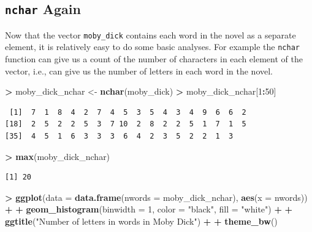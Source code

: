 \documentclass[]{krantz}
\makeatletter
\newenvironment{Shaded}{\begin{snugshade}}{\end{snugshade}}
\newcommand{\DataTypeTok}[1]{\textcolor[rgb]{0.27,0.27,0.27}{#1}}
\newcommand{\DecValTok}[1]{\textcolor[rgb]{0.06,0.06,0.06}{#1}}
\newcommand{\KeywordTok}[1]{\textcolor[rgb]{0.27,0.27,0.27}{\textbf{#1}}}
\newcommand{\NormalTok}[1]{#1}
\newcommand{\OperatorTok}[1]{\textcolor[rgb]{0.43,0.43,0.43}{\textbf{#1}}}
\newcommand{\StringTok}[1]{\textcolor[rgb]{0.5,0.5,0.5}{#1}}
\newenvironment{kframe}{%
\medskip{}
\setlength{\fboxsep}{.8em}
 \def\at@end@of@kframe{}%
 \ifinner\ifhmode%
  \def\at@end@of@kframe{\end{minipage}}%
  \begin{minipage}{\columnwidth}%
 \fi\fi%
 \def\FrameCommand##1{\hskip\@totalleftmargin \hskip-\fboxsep
 \colorbox{shadecolor}{##1}\hskip-\fboxsep
     \hskip-\linewidth \hskip-\@totalleftmargin \hskip\columnwidth}%
 \MakeFramed {\advance\hsize-\width
   \@totalleftmargin\z@ \linewidth\hsize
   \@setminipage}}%
 {\par\unskip\endMakeFramed%
 \at@end@of@kframe}
\renewenvironment{Shaded}{\begin{kframe}}{\end{kframe}}
\makeatother
\begin{document}
\hypertarget{nchar-again}{%
\subsection{\texorpdfstring{\texttt{nchar} Again}{nchar Again}}\label{nchar-again}}

Now that the vector \texttt{moby\_dick} contains each word in the novel as a separate element, it is relatively easy to do some basic analyses. For example the \texttt{nchar} function can give us a count of the number of characters in each element of the vector, i.e., can give us the number of letters in each word in the novel.

\begin{Shaded}
\begin{Highlighting}[]
\OperatorTok{>}\StringTok{ }\NormalTok{moby_dick_nchar <-}\StringTok{ }\KeywordTok{nchar}\NormalTok{(moby_dick)}
\OperatorTok{>}\StringTok{ }\NormalTok{moby_dick_nchar[}\DecValTok{1}\OperatorTok{:}\DecValTok{50}\NormalTok{]}
\end{Highlighting}
\end{Shaded}

\begin{verbatim}
 [1]  7  1  8  4  2  7  4  5  3  5  4  3  4  9  6  6  2
[18]  2  5  2  2  5  3  7 10  2  8  2  2  5  1  7  1  5
[35]  4  5  1  6  3  3  3  6  4  2  3  5  2  2  1  3
\end{verbatim}

\begin{Shaded}
\begin{Highlighting}[]
\OperatorTok{>}\StringTok{ }\KeywordTok{max}\NormalTok{(moby_dick_nchar)}
\end{Highlighting}
\end{Shaded}

\begin{verbatim}
[1] 20
\end{verbatim}

\begin{Shaded}
\begin{Highlighting}[]
\OperatorTok{>}\StringTok{ }\KeywordTok{ggplot}\NormalTok{(}\DataTypeTok{data =} \KeywordTok{data.frame}\NormalTok{(}\DataTypeTok{nwords =}\NormalTok{ moby_dick_nchar), }\KeywordTok{aes}\NormalTok{(}\DataTypeTok{x =}\NormalTok{ nwords)) }\OperatorTok{+}\StringTok{ }
\OperatorTok{+}\StringTok{   }\KeywordTok{geom_histogram}\NormalTok{(}\DataTypeTok{binwidth =} \DecValTok{1}\NormalTok{, }\DataTypeTok{color =} \StringTok{"black"}\NormalTok{, }\DataTypeTok{fill =} \StringTok{"white"}\NormalTok{) }\OperatorTok{+}\StringTok{ }
\OperatorTok{+}\StringTok{   }\KeywordTok{ggtitle}\NormalTok{(}\StringTok{"Number of letters in words in Moby Dick"}\NormalTok{) }\OperatorTok{+}\StringTok{ }
\OperatorTok{+}\StringTok{   }\KeywordTok{theme_bw}\NormalTok{()}
\end{Highlighting}
\end{Shaded}
\end{document}

